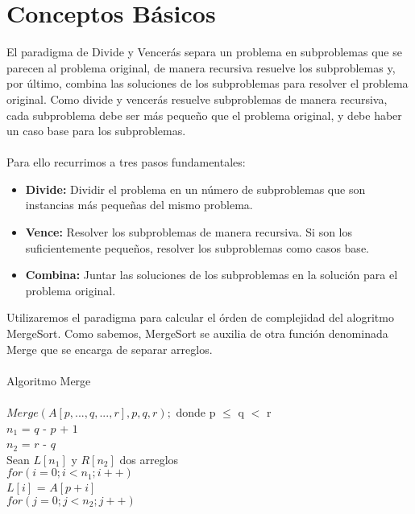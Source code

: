 \documentclass[12pt,twoside]{article}
\begin{document}
\section{Conceptos B\'asicos}
El paradigma de Divide y Vencer\'as separa un problema en subproblemas que se parecen al problema original, de manera recursiva resuelve los subproblemas y, por \'ultimo, combina las soluciones de los subproblemas para resolver el problema original.\newpage
Como divide y vencerás resuelve subproblemas de manera recursiva, cada subproblema debe ser m\'as pequeño que el problema original, y debe haber un caso base para los subproblemas.\\\\
Para ello recurrimos a tres pasos fundamentales:
\begin{itemize}
  \item {\bf Divide:} Dividir el problema en un n\'umero de subproblemas que son instancias m\'as pequeñas del mismo problema.
  \item {\bf Vence:} Resolver los subproblemas de manera recursiva. Si son los suficientemente peque\~{n}os, resolver los subproblemas como casos base.
  \item {\bf Combina:} Juntar las soluciones de los subproblemas en la soluci\'on para el problema original.
\end{itemize}
Utilizaremos el paradigma para calcular el \'orden de complejidad del alogritmo MergeSort. Como sabemos, MergeSort se auxilia de otra funci\'on denominada Merge que se encarga de separar arreglos.\\\\
Algoritmo Merge\\\\
\hspace*{1cm}$Merge(A[p,...,q,...,r],p,q,r);$ donde p $\leq$ q $<$ r\\
\hspace*{2cm}$n_{1}$ = $q$ - $p$ + $1$\\
\hspace*{2cm}$n_{2}$ = $r$ - $q$\\
\hspace*{2cm}Sean $L[n_{1}]$ y $R[n_{2}]$ dos arreglos\\
\hspace*{2cm}$for(i=0;i<n_{1};i++)$\\
\hspace*{2.5cm}$L[i]$ = $A[p+i]$\\
\hspace*{2cm}$for(j=0;j<n_{2};j++)$\\
\end{document}

